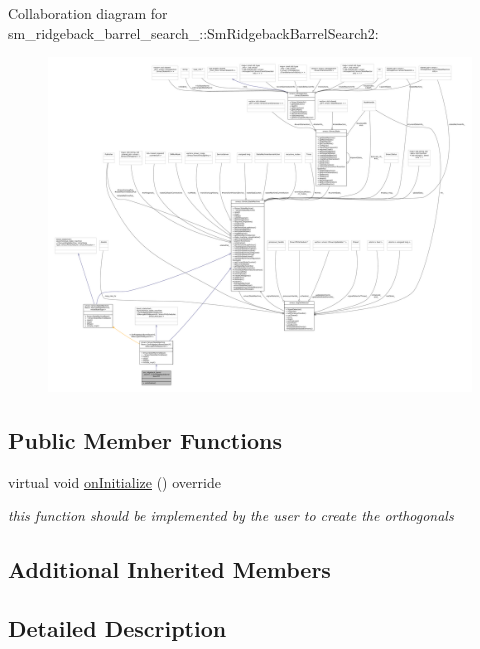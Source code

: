 Collaboration diagram for sm\+\_\+ridgeback\+\_\+barrel\+\_\+search\+\_\+:\+:Sm\+Ridgeback\+Barrel\+Search2\+:
\nopagebreak
\begin{figure}[H]
\begin{center}
\leavevmode
\includegraphics[width=350pt]{structsm__ridgeback__barrel__search__2_1_1SmRidgebackBarrelSearch2__coll__graph}
\end{center}
\end{figure}
\subsection*{Public Member Functions}
\begin{DoxyCompactItemize}
\item 
virtual void \hyperlink{structsm__ridgeback__barrel__search__2_1_1SmRidgebackBarrelSearch2_ab2f289c0f29d410439767a2f32cb0706}{on\+Initialize} () override
\begin{DoxyCompactList}\small\item\em this function should be implemented by the user to create the orthogonals \end{DoxyCompactList}\end{DoxyCompactItemize}
\subsection*{Additional Inherited Members}


\subsection{Detailed Description}


